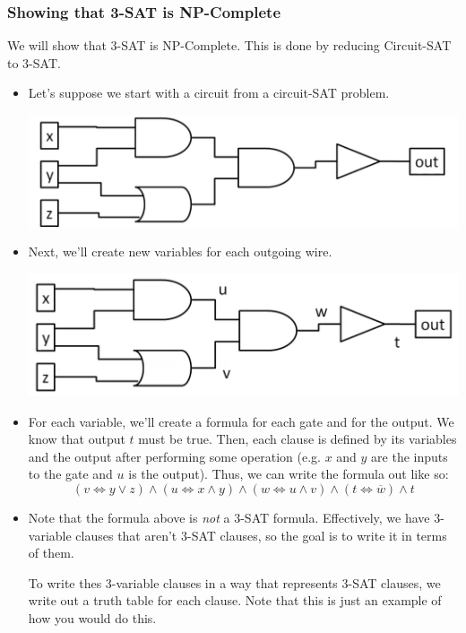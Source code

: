 \documentclass[letterpaper]{article}
\begin{document}
\subsubsection{Showing that 3-SAT is NP-Complete}
We will show that 3-SAT is NP-Complete. This is done by reducing Circuit-SAT to 3-SAT. 
\begin{itemize}
    \item Let's suppose we start with a circuit from a circuit-SAT problem. 
    \begin{center}
        \includegraphics[scale=0.4]{../assets/circuit_sat.png}
    \end{center}

    \item Next, we'll create new variables for each outgoing wire.
    \begin{center}
        \includegraphics[scale=0.4]{../assets/circuit_sat_2.png}
    \end{center}

    \item For each variable, we'll create a formula for each gate and for the output. We know that output $t$ must be true. Then, each clause is defined by its variables and the output after performing some operation (e.g. $x$ and $y$ are the inputs to the  gate and $u$ is the output). Thus, we can write the formula out like so: 
    \[(v \iff y \lor z) \land (u \iff x \land y) \land (w \iff u \land v) \land (t \iff \overline{w}) \land t\]

    \item Note that the formula above is \emph{not} a 3-SAT formula. Effectively, we have 3-variable clauses that aren't 3-SAT clauses, so the goal is to write it in terms of them. 
    \begin{mdframed}[]
        To write thes 3-variable clauses in a way that represents 3-SAT clauses, we write out a truth table for each clause. Note that this is just an example of how you would do this.
        

\end{mdframed}
\end{itemize}
\end{document}
